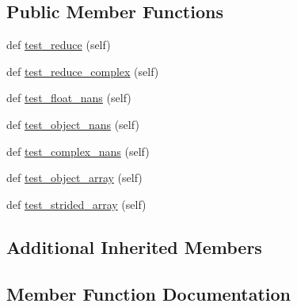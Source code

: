 \subsection*{Public Member Functions}
\begin{DoxyCompactItemize}
\item 
def \hyperlink{classnumpy_1_1core_1_1tests_1_1test__umath_1_1TestMinimum_a91471c39a5956939f08aaea9a484556f}{test\+\_\+reduce} (self)
\item 
def \hyperlink{classnumpy_1_1core_1_1tests_1_1test__umath_1_1TestMinimum_a3a3cde4f5684aaf780ba3d236acf709e}{test\+\_\+reduce\+\_\+complex} (self)
\item 
def \hyperlink{classnumpy_1_1core_1_1tests_1_1test__umath_1_1TestMinimum_ad4aa8824095811ebe71693283ec4a7b8}{test\+\_\+float\+\_\+nans} (self)
\item 
def \hyperlink{classnumpy_1_1core_1_1tests_1_1test__umath_1_1TestMinimum_ae969d5d026fc4aecf506fb296fbe76da}{test\+\_\+object\+\_\+nans} (self)
\item 
def \hyperlink{classnumpy_1_1core_1_1tests_1_1test__umath_1_1TestMinimum_a568a132e2f9892f07abebd4bf481856e}{test\+\_\+complex\+\_\+nans} (self)
\item 
def \hyperlink{classnumpy_1_1core_1_1tests_1_1test__umath_1_1TestMinimum_ae1276bc0163aec327f68310ae9f549be}{test\+\_\+object\+\_\+array} (self)
\item 
def \hyperlink{classnumpy_1_1core_1_1tests_1_1test__umath_1_1TestMinimum_a07179981c5f611bb399eeed0a2b67dba}{test\+\_\+strided\+\_\+array} (self)
\end{DoxyCompactItemize}
\subsection*{Additional Inherited Members}


\subsection{Member Function Documentation}
\mbox{\label{classnumpy_1_1core_1_1tests_1_1test__umath_1_1TestMinimum_a568a132e2f9892f07abebd4bf481856e}} 
